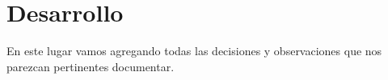\section{Desarrollo}

En este lugar vamos agregando todas las decisiones y observaciones que nos parezcan pertinentes documentar.